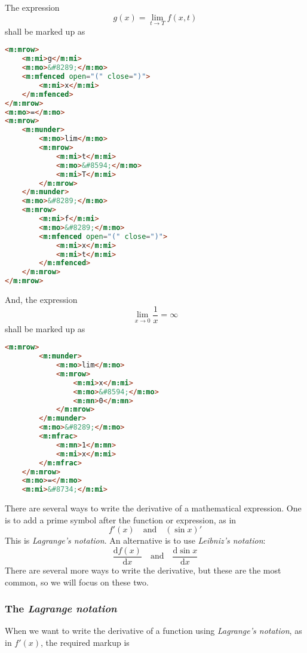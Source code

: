\documentclass[english,a4paper,11pt]{article}
\begin{document}
\begin{examples}
	
	The expression 
\begin{equation}
g(x) =\lim_{t \rightarrow T} f(x,t)
\end{equation}
shall be marked up as
\begin{lstlisting}[language=HTML]
<m:mrow>
	<m:mi>g</m:mi>
	<m:mo>&#8289;</m:mo>
	<m:mfenced open="(" close=")">
		<m:mi>x</m:mi>
	</m:mfenced>
</m:mrow>
<m:mo>=</m:mo>
<m:mrow>
	<m:munder>
		<m:mo>lim</m:mo>
		<m:mrow>
			<m:mi>t</m:mi>
			<m:mo>&#8594;</m:mo>
			<m:mi>T</m:mi>
		</m:mrow>
	</m:munder>
	<m:mo>&#8289;</m:mo>
	<m:mrow>
		<m:mi>f</m:mi>
		<m:mo>&#8289;</m:mo>
		<m:mfenced open="(" close=")">
			<m:mi>x</m:mi>
			<m:mi>t</m:mi>
		</m:mfenced>
	</m:mrow>
</m:mrow>
\end{lstlisting}

	And, the expression 
	\begin{equation}
	\lim_{x \rightarrow 0} \frac{1}{x} = \infty
	\end{equation}
	shall be marked up as
	\begin{lstlisting}[language=HTML]
	<m:mrow>
		<m:munder>
			<m:mo>lim</m:mo>
			<m:mrow>
				<m:mi>x</m:mi>
				<m:mo>&#8594;</m:mo>
				<m:mn>0</m:mn>
			</m:mrow>
		</m:munder>
		<m:mo>&#8289;</m:mo>
		<m:mfrac>
			<m:mn>1</m:mn>
			<m:mi>x</m:mi>
		</m:mfrac>
	</m:mrow>
	<m:mo>=</m:mo>
	<m:mi>&#8734;</m:mi>
	\end{lstlisting}
\end{examples}

\bigskip
There are several ways to write the derivative of a mathematical expression. One is to add a prime symbol after the function or expression, as in 
\begin{equation}
f'(x)\quad\text{and}\quad (\sin x)'
\end{equation}
This is \emph{Lagrange's notation}. An alternative is to use \emph{Leibniz's notation}:
\begin{equation}
\frac{\text{d}f(x)}{\text{d}x}\quad\text{and}\quad \frac{\text{d}\sin x}{\text{d}x}
\end{equation}
There are several more ways to write the derivative, but these are the most common, so we will focus on these two.

\subsubsection{The \emph{Lagrange notation}}
When we want to write the derivative of a function using \emph{Lagrange's notation}, as in $f'(x)$, the required markup is
\end{document}
